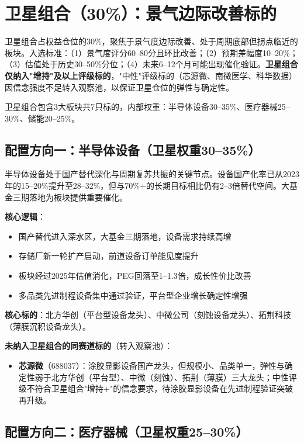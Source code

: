\section{卫星组合（30\%）：景气边际改善标的}

卫星组合占权益仓位的30\%，聚焦于景气度边际改善、处于周期底部但拐点临近的板块。入选标准：（1）景气度评分60--80分且环比改善；（2）预期差幅度10--20\%；（3）估值处于历史30--50\%分位；（4）未来6--12个月可能出现催化验证。\textbf{卫星组合仅纳入"增持"及以上评级标的}，"中性"评级标的（芯源微、南微医学、科华数据）因信念强度不足转入观察池，以保证卫星仓位的弹性与确定性。

卫星组合包含3大板块共7只标的，内部权重：半导体设备30--35\%、医疗器械25--30\%、储能20--25\%。

\subsection{配置方向一：半导体设备（卫星权重30--35\%）}

半导体设备处于国产替代深化与周期复苏共振的关键节点。设备国产化率已从2023年的15--20\%提升至28--32\%，但与70\%+的长期目标相比仍有2--3倍替代空间。大基金三期落地为板块提供重要催化。

\textbf{核心逻辑}：
\vspace{0.2em}
\begin{itemize}[leftmargin=2em]
\item 国产替代进入深水区，大基金三期落地，设备需求持续高增
\item 存储厂新一轮扩产启动，前道设备订单能见度提升
\item 板块经过2025年估值消化，PEG回落至1--1.3倍，成长性价比改善
\item 多品类先进制程设备集中通过验证，平台型企业增长确定性增强
\end{itemize}

\textbf{核心标的}：北方华创（平台型设备龙头）、中微公司（刻蚀设备龙头）、拓荆科技（薄膜沉积设备龙头）。

\textbf{未纳入卫星组合的同赛道标的}（转入观察池）：
\vspace{0.2em}
\begin{itemize}[leftmargin=2em]
\item \textbf{芯源微}（688037）：涂胶显影设备国产龙头，但规模小、品类单一，弹性与确定性弱于北方华创（平台型）、中微（刻蚀）、拓荆（薄膜）三大龙头；中性评级不符合卫星组合"增持+"的信念要求，待涂胶显影设备在先进制程验证突破再升级。
\end{itemize}

\subsection{配置方向二：医疗器械（卫星权重25--30\%）}

